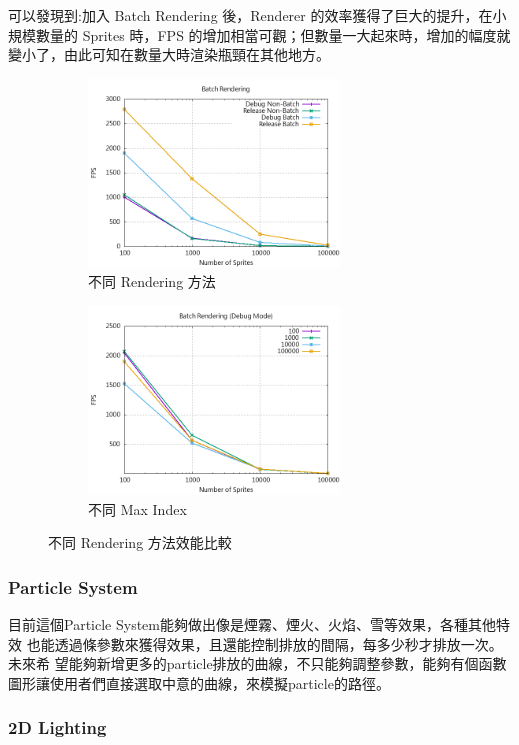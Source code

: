 可以發現到:加入 Batch Rendering 後，Renderer 的效率獲得了巨大的提升，在小規模數量的 Sprites 時，FPS 的增加相當可觀；但數量一大起來時，增加的幅度就變小了，由此可知在數量大時渲染瓶頸在其他地方。

\begin{figure}[h]
    \begin{subfigure}{0.5\textwidth}
        \includegraphics[width=0.9\linewidth, height=5cm]{./resources/batch_compare.png} 
        \caption{不同 Rendering 方法}
        \label{fig:subim1}
    \end{subfigure}
    \begin{subfigure}{0.5\textwidth}
        \includegraphics[width=0.9\linewidth, height=5cm]{./resources/max_index.png}
        \caption{不同 Max Index}
        \label{fig:subim2}
    \end{subfigure}
\caption{不同 Rendering 方法效能比較}
\label{fig:image2}
\end{figure}

\subsubsection{Particle System}

目前這個Particle System能夠做出像是煙霧、煙火、火焰、雪等效果，各種其他特效 也能透過條參數來獲得效果，且還能控制排放的間隔，每多少秒才排放一次。未來希 望能夠新增更多的particle排放的曲線，不只能夠調整參數，能夠有個函數圖形讓使用者們直接選取中意的曲線，來模擬particle的路徑。

\subsubsection{2D Lighting}

